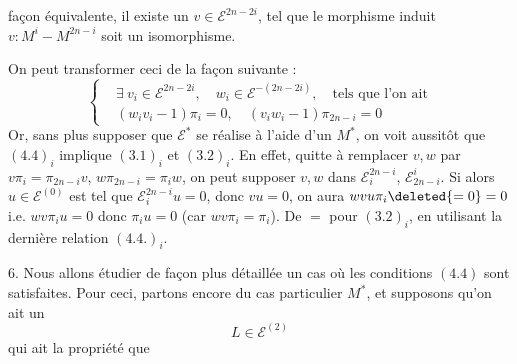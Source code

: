 façon équivalente, il existe un $v\in\mathcal E^{2n-2i}$, tel que le morphisme induit $v:M^i-M^{2n-i}$ soit un isomorphisme.

On peut transformer ceci de la façon suivante :
\[
\left\{\begin{aligned}
&\exists\ v_i\in\mathcal E^{2n-2i},\quad w_i\in\mathcal E^{-(2n-2i)},\quad\text{tels que l'on ait}\\
&(w_iv_i-1)\pi_i=0,\quad(v_iw_i-1)\pi_{2n-i}=0
\end{aligned}\right.
\tag*{$(4.4)_i$}
\]
Or, sans plus supposer que $\mathcal E^*$ se réalise à l'aide d'un $M^*$, on voit aussitôt que $(4.4)_i$ implique $(3.1)_i$ et $(3.2)_i$. En effet, quitte à remplacer $v,w$ par $v\pi_i=\pi_{2n-i}v$, $w\pi_{2n-i}=\pi_iw$, on peut supposer $v,w$ dans $\mathcal E_i^{2n-i}$, $\mathcal E_{2n-i}^i$. Si alors  $u\in\mathcal E^{(0)}$ est tel que $\mathcal E_i^{2n-i}u=0$, donc $vu=0$, on aura $wvu\pi_i\deleted{=0}=0$ i.e. $wv\pi_i u=0$ donc $\pi_i u=0$ (car $wv\pi_i=\pi_i$). De $=$ pour $(3.2)_i$, en utilisant la dernière relation $(4.4.)_i$.


6. Nous allons étudier de façon plus détaillée un cas où les conditions $(4.4)$ sont satisfaites. Pour ceci, partons encore du cas particulier $M^*$,  et supposons qu'on ait un
\[
L\in\mathcal E^{(2)}
\tag{6.0}
\]
qui ait la propriété que
